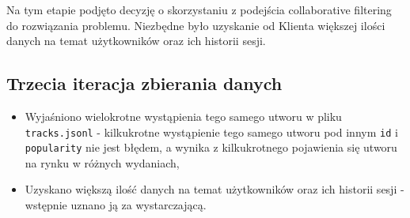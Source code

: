 \documentclass[10pt,a4paper]{article}
\begin{document}
Na tym etapie podjęto decyzję o skorzystaniu z podejścia collaborative filtering do rozwiązania problemu. Niezbędne było uzyskanie od Klienta większej ilości danych na temat użytkowników oraz ich historii sesji.

\subsection{Trzecia iteracja zbierania danych}
\begin{itemize}
\item Wyjaśniono wielokrotne wystąpienia tego samego utworu w pliku \texttt{tracks.jsonl} - kilkukrotne wystąpienie tego samego utworu pod innym \texttt{id} i \texttt{popularity} nie jest błędem, a wynika z kilkukrotnego pojawienia się utworu na rynku w różnych wydaniach,
\item Uzyskano większą ilość danych na temat użytkowników oraz ich historii sesji - wstępnie uznano ją za wystarczającą.
\end{itemize}
\end{document}
